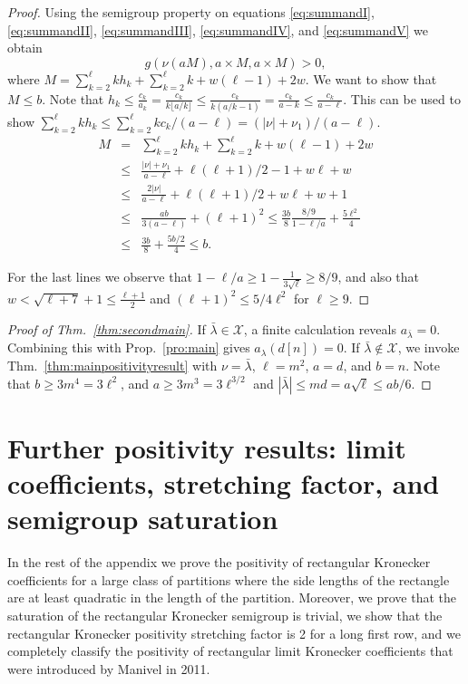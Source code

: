 \documentclass{article}
\numberwithin{equation}{section}
\theoremstyle{definition}
\def\la{\lambda}
\newcommand{\exceptions}{{\mathscr{X}}}
\begin{document}
\begin{proof}
Using the semigroup property on equations \eqref{eq:summandI}, \eqref{eq:summandII}, \eqref{eq:summandIII}, \eqref{eq:summandIV}, and \eqref{eq:summandV} we obtain
\begin{equation*}
g(\nu(aM),a \times M,a \times M) > 0,
\end{equation*}
where $M = \sum_{k=2}^\ell k h_k +  \sum_{k=2}^\ell k + w(\ell-1) + 2w$.
We want to show that $M \leq b$.
Note that
$
h_k \leq \frac{c_k}{a_k} = \frac{c_k}{k\lfloor a/k\rfloor} \leq \frac{c_k}{k(a/k-1)} = \frac{c_k}{a-k} \leq \frac {c_k}{a-\ell}.
$
This can be used to show
$
\sum_{k=2}^\ell k h_k \leq \sum_{k=2}^\ell k {c_k}/({a-\ell}) = (|\nu|+\nu_1)/({a-\ell}).
$
\begin{eqnarray*}
M &=& \textstyle\sum_{k=2}^\ell k h_k +  \sum_{k=2}^\ell k + w(\ell-1) + 2w\\
&\leq&  \frac{|\nu|+\nu_1}{a-\ell} + \ell(\ell+1)/2-1 + w\ell +w \\
&\leq& \textstyle\frac{2|\nu|}{a-\ell} + \ell(\ell+1)/2+ w\ell + w+1\\
&\leq&  \frac{ ab}{3 ( a - \ell) } +(\ell+1)^2 \leq  \frac{3b}{8} \frac{8/9}{1 - \ell/a} + \frac{5\ell^2}{4} \\ 
&\leq & \frac{3b}{8} + \frac{5 b/2}{4} 
\leq b.
\end{eqnarray*}

For the last lines we observe that $1 - \ell/a \geq 1 -\frac{1}{3\sqrt{\ell} } \geq 8/9$, and also that $w < \sqrt{\ell+7}+1\leq \frac{\ell+1}{2}$ and $(\ell+1)^2 \leq 5/4 \ell^2$ for $\ell \geq 9$. 
\end{proof}



\begin{proof}[Proof of Thm.~\ref{thm:secondmain}]
If $\bar\la \in \exceptions$, a finite calculation reveals $a_{\bar\la} = 0$.
Combining this with Prop.~\ref{pro:main} gives $a_\la(d[n])=0$.
If $\bar\la \notin \exceptions$,
we invoke Thm.~\ref{thm:mainpositivityresult} with $\nu=\bar\la$, $\ell = m^2$, 
$a=d$, and $b=n$.
Note that $b \geq 3 m^4 = 3 \ell^2$,
and $a \geq 3 m^3 = 3 \ell^{3/2} $
and $|\bar\la|\leq md = a\sqrt\ell \leq ab/6$.
\end{proof}








\section{Further positivity results: limit coefficients, stretching factor, and semigroup saturation}\label{sec:corollaries}
In the rest of the appendix
we prove the positivity of rectangular Kronecker coefficients for a large class of partitions
where the side lengths of the rectangle are at least quadratic in the length of the partition.
Moreover, we prove that the saturation of the rectangular Kronecker semigroup is trivial,
we show that the rectangular Kronecker positivity stretching factor is 2 for a long first row,
and we completely classify the positivity of
rectangular limit Kronecker coefficients that were introduced by Manivel in 2011.
\end{document}
